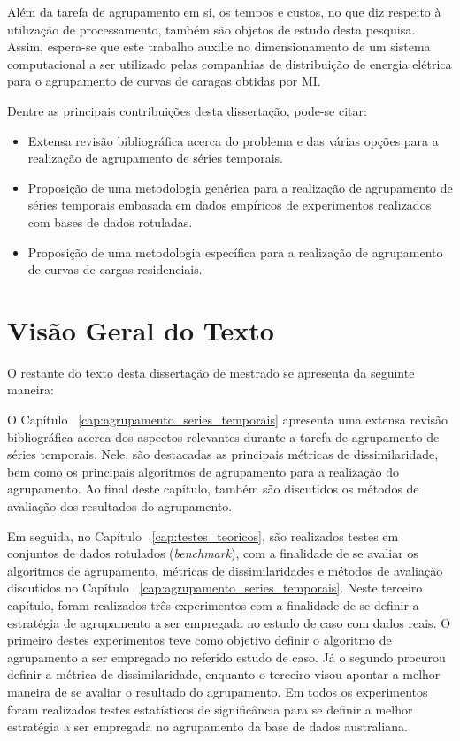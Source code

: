 Além da tarefa de agrupamento em si, os tempos e custos, no que diz respeito à utilização de processamento, também são objetos de estudo desta pesquisa. Assim, espera-se que este trabalho auxilie no dimensionamento de um sistema computacional a ser utilizado pelas companhias de distribuição de energia elétrica para o agrupamento de curvas de caragas obtidas por MI.


Dentre as principais contribuições desta dissertação, pode-se citar:
\begin{itemize}
	\item Extensa revisão bibliográfica acerca do problema e das várias opções para a realização de agrupamento de séries temporais.
	\item Proposição de uma metodologia genérica para a realização de agrupamento de séries temporais embasada em dados empíricos de experimentos realizados com bases de dados rotuladas.
	\item Proposição de uma metodologia específica para a realização de agrupamento de curvas de cargas residenciais.
\end{itemize}

\section{Visão Geral do Texto}

O restante do texto desta dissertação de mestrado se apresenta da seguinte maneira:

O Capítulo ~\ref{cap:agrupamento_series_temporais} apresenta uma extensa revisão bibliográfica acerca dos aspectos relevantes durante a tarefa de agrupamento de séries temporais. Nele, são destacadas as principais métricas de dissimilaridade, bem como os principais algoritmos de agrupamento para a realização do agrupamento. Ao final deste capítulo, também são discutidos os métodos de avaliação dos resultados do agrupamento.

Em seguida, no Capítulo ~\ref{cap:testes_teoricos}, são realizados testes em conjuntos de dados rotulados (\emph{benchmark}), com a finalidade de se avaliar os algoritmos de agrupamento, métricas de dissimilaridades e métodos de avaliação discutidos no Capítulo ~\ref{cap:agrupamento_series_temporais}. Neste terceiro capítulo, foram realizados três experimentos com a finalidade de se definir a estratégia de agrupamento a ser empregada no estudo de caso com dados reais. O primeiro destes experimentos teve como objetivo definir o algoritmo de agrupamento a ser empregado no referido estudo de caso. Já o segundo procurou definir a métrica de dissimilaridade, enquanto o terceiro visou apontar a melhor maneira de se avaliar o resultado do agrupamento. Em todos os experimentos foram realizados testes estatísticos de significância para se definir a melhor estratégia a ser empregada no agrupamento da base de dados australiana.

